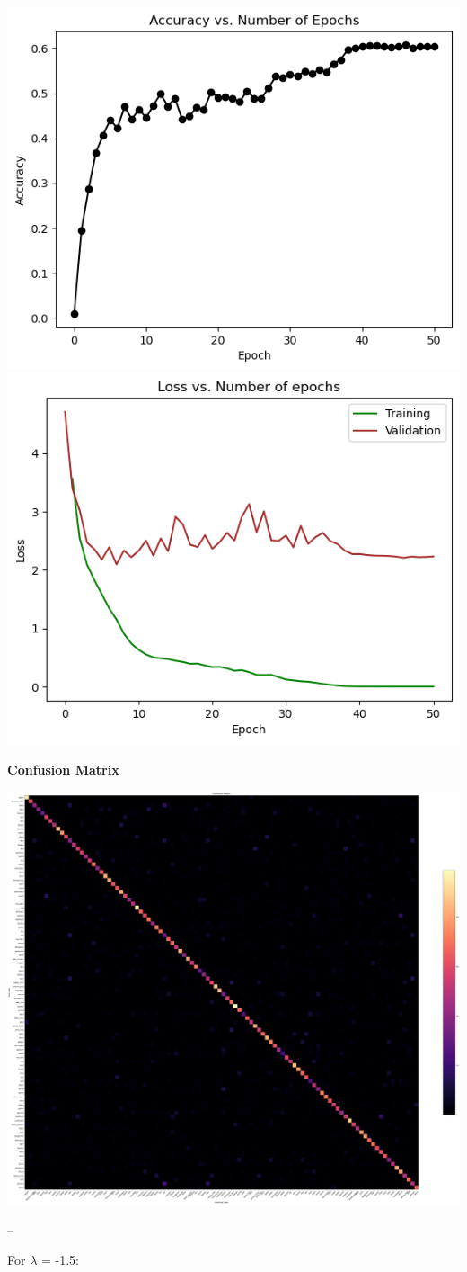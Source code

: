 \documentclass{article}
\begin{document}
        \includegraphics[width=0.5\linewidth]{images/LogGumbelSoftmax/log-gumbel-acc-epoch.png}
        \includegraphics[width=0.5\linewidth]{images/LogGumbelSoftmax/log-gumbel-loss-epoch.png}

\textbf{Confusion Matrix}

\includegraphics[width=0.9\linewidth]{images/LogGumbelSoftmax/cm-loggumbel.png}

--

\vspace{6pt}
For \(\lambda\) = -1.5:
\end{document}
